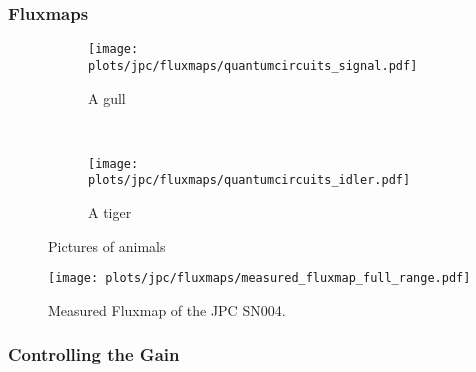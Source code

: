 \subsubsection{Fluxmaps}




\begin{figure}
    \centering
    \begin{subfigure}[b]{8.6cm}
        \texttt{[image: plots/jpc/fluxmaps/quantumcircuits\_signal.pdf]}
        \caption{A gull}
        \label{fig:jpc:fluxmaps:reference:signal_resonator}
    \end{subfigure}
    ~ %
    \begin{subfigure}[b]{8.6cm}
        \texttt{[image: plots/jpc/fluxmaps/quantumcircuits\_idler.pdf]}
        \caption{A tiger}
        \label{fig:jpc:fluxmaps:reference:idler_resonator}
    \end{subfigure}
    \caption{Pictures of animals}\label{fig:jpc:fluxmaps:reference:main}
\end{figure}



\begin{figure}[htb!]
    \centering
        \texttt{[image: plots/jpc/fluxmaps/measured\_fluxmap\_full\_range.pdf]}
        \caption{Measured Fluxmap of the JPC SN004.}
        \label{fig:jpc:fluxmaps:measured_signal_resonator}
\end{figure}






\FloatBarrier
\subsubsection{Controlling the Gain}




